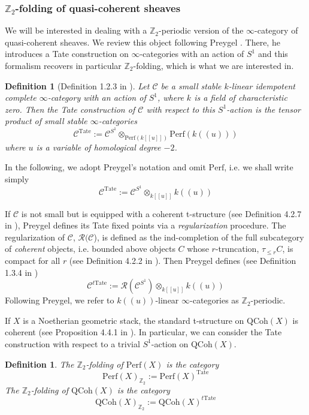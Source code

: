 \documentclass[11pt,letterpaper]{amsart}
\newtheorem{definition}[dummy]{Definition}
\newcommand{\bZ}{\mathbb{Z}}
\newcommand{\scrC}{\mathscr{C}}
\newcommand{\scrR}{\mathscr{R}}
\newcommand{\Perf}{\mathrm{Perf}}
\newcommand{\QCoh}{\mathrm{QCoh}}
\begin{document}
\subsubsection{$\bZ_2$-folding of quasi-coherent sheaves}
We will be interested in dealing with a $\bZ_2$-periodic version of the $\infty$-category of quasi-coherent sheaves. We review this object following Preygel \cite{PreyTate}. There, he introduces a Tate construction on $\infty$-categories with an action of $S^1$ and this formalism recovers in particular $\mathbb{Z}_2$-folding, which is what we are interested in.  
\begin{definition}[Definition 1.2.3 in \cite{PreyTate}]
Let $\mathscr{C}$ be a small stable $k$-linear idempotent complete $\infty$-category with an action of $S^1$, where $k$ is a field of characteristic zero. Then the Tate construction of $\scrC$ with respect to this $S^1$-action is the tensor product of small stable $\infty$-categories
$$\scrC^{\mathrm{Tate}}:=\scrC^{S^1}\otimes_{\Perf(k[[u]])} \Perf(k((u)))$$
where $u$ is a variable of homological degree $-2$. 
\end{definition}
In the following, we adopt Preygel's notation and omit $\Perf$, i.e. we shall write simply
$$\scrC^{\mathrm{Tate}}:=\scrC^{S^1}\otimes_{k[[u]]}k((u))$$

If $\scrC$ is not small but is equipped with a coherent t-structure (see Definition 4.2.7 in \cite{PreyTate}), Preygel defines its Tate fixed points via a \emph{regularization} procedure. The regularization of $\scrC$, $\scrR(\scrC$), is defined as the ind-completion of the full subcategory of \emph{coherent} objects, i.e. bounded above objects $C$ whose $r$-truncation, $\tau_{\leq r}C$, is compact for all $r$ (see Definition 4.2.2 in \cite{PreyTate}). Then Preygel defines (see Definition 1.3.4 in \cite{PreyTate})
$$\scrC^{t\mathrm{Tate}}:=\scrR(\scrC^{S^1})\otimes_{k[[u]]}k((u))$$
Following Preygel, we refer to $k((u))$-linear $\infty$-categories as $\bZ_2$-periodic. 

If $X$ is a Noetherian geometric stack, the standard t-structure on $\QCoh(X)$ is coherent (see Proposition 4.4.1 in \cite{PreyTate}). In particular, we can consider the Tate construction with respect to a trivial $S^1$-action on $\QCoh(X)$.
\begin{definition}
The \emph{$\bZ_2$-folding} of $\Perf(X)$ is the category 
$$
\Perf(X)_{\mathbb{Z}_2} := \Perf(X)^{\mathrm{Tate}}
$$
The \emph{$\bZ_2$-folding} of $\QCoh(X)$ is the category $$\QCoh(X)_{\mathbb{Z}_2}:=\QCoh(X)^{t\mathrm{Tate}}$$
\end{definition}
\end{document}
